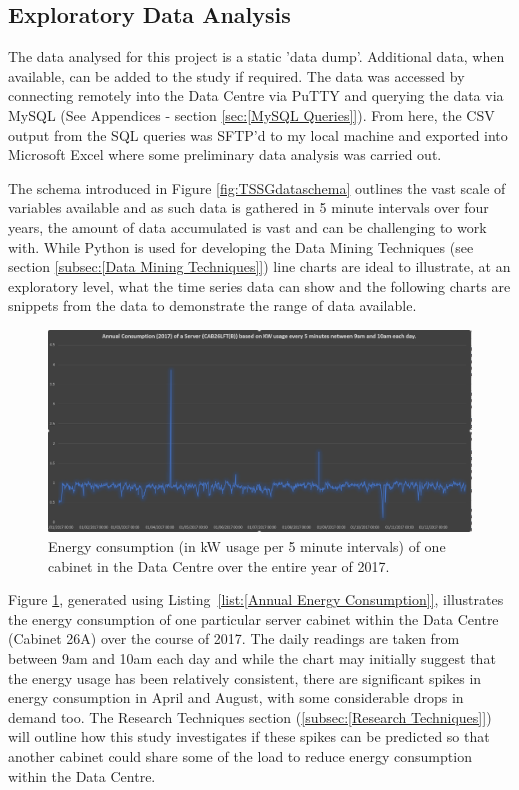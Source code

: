 \documentclass[12pt]{scrartcl}
\begin{document}
\subsection{Exploratory Data Analysis}
\label{subsec:[Exploratory Data Analysis]}
The data analysed for this project is a static 'data dump'. Additional data, when available, can be added to the study if required. The data was accessed by connecting remotely into the Data Centre via PuTTY and querying the data via MySQL (See Appendices - section \ref{sec:[MySQL Queries]}). From here, the CSV output from the SQL queries was SFTP'd to my local machine and exported into Microsoft Excel where some preliminary data analysis was carried out. 

The schema introduced in Figure \ref{fig:TSSGdataschema} outlines the vast scale of variables available and as such data is gathered in 5 minute intervals over four years, the amount of data accumulated is vast and can be challenging to work with. While Python is used for developing the Data Mining Techniques (see section \ref{subsec:[Data Mining Techniques]})  line charts are ideal to illustrate, at an exploratory level, what the time series data can show and the following charts are snippets from the data to demonstrate the range of data available.

\begin{figure}[h]
  \caption{Energy consumption (in kW usage per 5 minute intervals) of one cabinet in the Data Centre over the entire year of 2017.}
  \label{fig:Annualenergyfigure}
  \centering
    \includegraphics[scale=0.30]{Annual_energy_consumption.png}
\end{figure}

Figure \ref{fig:Annualenergyfigure}, generated using Listing~\ref{list:[Annual Energy Consumption]}, illustrates the energy consumption of one particular server cabinet within the Data Centre (Cabinet 26A) over the course of 2017. The daily readings are taken from between 9am and 10am each day and while the chart may initially suggest that the energy usage has been relatively consistent, there are significant spikes in energy consumption in April and August, with some considerable drops in demand too. The Research Techniques section (\ref{subsec:[Research Techniques]}) will outline how this study investigates if these spikes can be predicted so that another cabinet could share some of the load to reduce energy consumption within the Data Centre.
\end{document}
